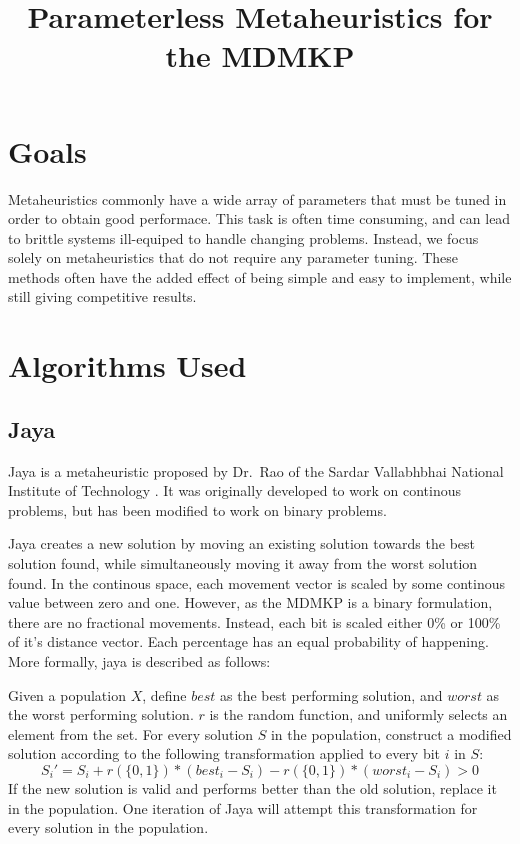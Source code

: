 \documentclass[11pt, letterpaper, onecolumn]{article}
\title{\textbf{Parameterless Metaheuristics for the MDMKP}}
\begin{document}
\maketitle

\section{Goals}

Metaheuristics commonly have a wide array of parameters that must be tuned in order to
obtain good performace. This task is often time consuming, and can lead to brittle systems
ill-equiped to handle changing problems. Instead, we focus solely on metaheuristics that
do not require any parameter tuning. These methods often have the added effect of being
simple and easy to implement, while still giving competitive results.

\section{Algorithms Used}

\subsection{Jaya}

Jaya is a metaheuristic proposed by Dr.~Rao of the Sardar Vallabhbhai National
Institute of Technology%
. It was originally developed to work on continous
problems, but has been modified to work on binary problems.

Jaya creates a new solution by moving an existing solution towards the best solution found, while simultaneously moving it away from the worst solution found. In the continous space, each movement vector is scaled by some continous value between zero and one. However, as the MDMKP is a binary formulation, there are no fractional movements. Instead, each bit is scaled either 0\% or 100\% of it's distance vector. Each percentage has an equal probability of happening. More formally, jaya is described as follows:

 Given a population $X$, define $best$ as the best performing solution, and $worst$ as the worst performing solution. $r$ is the random function, and uniformly selects an element from the set. For every solution $S$ in the population, construct a modified solution according to the following transformation applied to every bit $i$ in $S$:
\begin{equation} S_i' = S_i + r(\{0, 1\})*(best_i - S_i) - r(\{0, 1\})*(worst_i - S_i) > 0 \end{equation}
If the new solution is valid and performs better than the old solution, replace it in the population. One iteration of Jaya will attempt this transformation for every solution in the population. 
\end{document}
